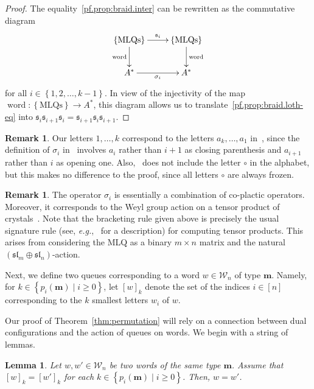 \documentclass[reqno]{amsart}
\newcommand{\0}{\phantom{c}}
\DeclareMathOperator{\word}{word} %
\newcommand{\mm}{\mathbf{m}}
\newcommand{\mcW}{\mathcal{W}}
\newcommand{\fraks}{\mathfrak{s}}
\newcommand{\set}[1]{\left\{ #1 \right\}}
\newcommand{\ive}[1]{\left[ #1 \right]}
\theoremstyle{plain}
\newtheorem{lemma}[thm]{Lemma}
\theoremstyle{definition}
\newtheorem{remark}[thm]{Remark}
\numberwithin{equation}{section}
\begin{document}
\begin{proof}
The equality~\eqref{pf.prop:braid.inter} can be rewritten as the
commutative diagram
\[
\xymatrix{
 \set{\text{MLQs}} \ar[r]^{\fraks_i} \ar[d]_{\word} & \set{\text{MLQs}} \ar[d]^{\word} \\
 A^* \ar[r]_{\sigma_i} & A^*
}
\]
for all $i \in \set{1, 2, \dotsc, k-1}$.
In view of the injectivity of the map $\word \colon \set{\text{MLQs}} \to A^*$,
this diagram allows us to translate~\eqref{pf.prop:braid.loth-eq} into
$\fraks_i \fraks_{i+1} \fraks_i = \fraks_{i+1} \fraks_i \fraks_{i+1}$.
\end{proof}

\begin{remark}
Our letters $1, \ldots, k$ correspond to the letters $a_k, \ldots, a_1$ in~\cite{Loth},
since the definition of $\sigma_i$ in~\cite{Loth} involves $a_i$ rather
than $i+1$ as closing parenthesis and $a_{i+1}$ rather than $i$ as opening one.
Also,~\cite{Loth} does not include the letter $\circ$ in the alphabet,
but this makes no difference to the proof, since all letters $\circ$ are always frozen.
\end{remark}

\begin{remark}
The operator $\sigma_i$ is essentially a combination of co-plactic operators.
Moreover, it corresponds to the Weyl group action on a tensor product of crystals~\cite{BS17}.
Note that the bracketing rule given above is precisely the usual signature rule (see, \textit{e.g.},~\cite[Sec.~2.4]{BS17} for a description) for computing tensor products.
This arises from considering the MLQ as a binary $m \times n$ matrix and the natural $(\mathfrak{sl}_m \oplus \mathfrak{sl}_n)$-action.
\end{remark}

Next, we define two queues corresponding to a word $w \in \mcW_n$ of type $\mm$.
Namely, for $k \in \set{p_i(\mm) \mid i \geq 0}$, let $[w]_k$ denote the set of the indices $i \in \ive{n}$
corresponding to the $k$ smallest letters $w_i$ of $w$.

Our proof of Theorem~\ref{thm:permutation} will rely on a connection between dual configurations and the action of queues on words.
We begin with a string of lemmas.

\begin{lemma} \label{lem:SL.reconstruct}
Let $w, w' \in \mcW_n$ be two words of the same type $\mm$.
Assume that $[w]_k = [w']_k$ for each $k \in \set{p_i(\mm) \mid i \geq 0}$.
Then, $w = w'$.
\end{lemma}
\end{document}
